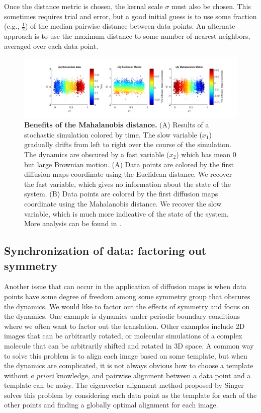 \documentclass[12pt]{article}
\begin{document}
Once the distance metric is chosen, the kernal scale $\sigma$ must also be chosen. This sometimes requires trial and error, but a good initial guess is to use some fraction (e.g., $\frac{1}{2}$) of the median pairwise distance between data points. An alternate approach is to use the maximum distance to some number of nearest neighbors, averaged over each data point.

\begin{figure}[here]
\includegraphics[width=\linewidth, clip=true, trim=115 0 75  0]{figures/my_mahalanobis}
\caption{\textbf{Benefits of the Mahalanobis distance.} (A) Results of a stochastic simulation colored by time. The slow variable ($x_1$) gradually drifts from left to right over the course of the simulation. The dynamics are obscured by a fast variable ($x_2$) which has mean $0$ but large Brownian motion. (A) Data points are colored by the first diffusion maps coordinate using the Euclidean distance. We recover the fast variable, which gives no information about the state of the system. (B) Data points are colored by the first diffusion maps coordinate using the Mahalanobis distance. We recover the slow variable, which is much more indicative of the state of the system. More analysis can be found in \cite{Dsilva2015}.}
\label{fig:mahalanobis}
\end{figure}

\subsection{Synchronization of data: factoring out symmetry}

Another issue that can occur in the application of diffusion maps is when data points have some degree of freedom among some symmetry group that obscures the dynamics. We would like to factor out the effects of symmetry and focus on the dynamics. One example is dynamics under periodic boundary conditions where we often want to factor out the translation. Other examples include 2D images that can be arbitrarily rotated, or molecular simulations of a complex molecule that can be arbitrarily shifted and rotated in 3D space. A common way to solve this problem is to align each image based on some template, but when the dynamics are complicated, it is not always obvious how to choose a template without \textit{a priori} knowledge, and pairwise alignment between a data point and a template can be noisy. The eigenvector alignment method proposed by Singer \cite{Singer2011a} solves this problem by considering each data point as the template for each of the other points and finding a globally optimal alignment for each image. \vspace{1mm}
\end{document}
